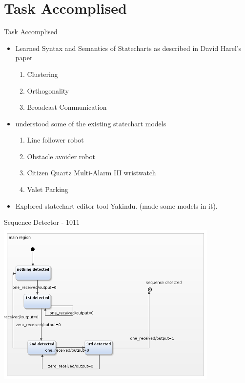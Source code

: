 \documentclass[10pt, a4paper]{beamer}
\begin{document}
\section{Task Accomplised}
\begin{frame}{Task Accomplised}
	\begin{itemize}
		\item Learned Syntax and Semantics of Statecharts as
		described in David Harel's paper
		\begin{enumerate}
			\item Clustering
			\item Orthogonality
			\item Broadcast Communication
		\end{enumerate}
		\item understood some of the existing statechart models
		\begin{enumerate}
			\item Line follower robot
			\item Obstacle avoider robot
			\item Citizen
			Quartz Multi-Alarm III wristwatch
			\item Valet Parking
		\end{enumerate}
	\item Explored statechart editor tool Yakindu. (made some models in it).
	\end{itemize}

\end{frame}
\begin{frame}{Sequence Detector - 1011}
\includegraphics[width=11cm, height=8.38cm]{sequence1011.png}
\end{frame}
\end{document}
